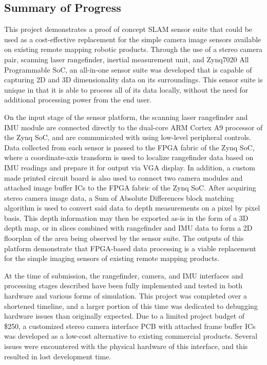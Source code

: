 \subsection{Summary of Progress}
This project demonstrates a proof of concept SLAM sensor suite that could be used as a cost-effective replacement for the simple camera image sensors available on existing remote mapping robotic products. Through the use of a stereo camera pair, scanning laser rangefinder, inertial measurement unit, and Zynq7020 All Programmable SoC, an all-in-one sensor suite was developed that is capable of capturing 2D and 3D dimensionality data on its surroundings. This sensor suite is unique in that it is able to process all of its data locally, without the need for additional processing power from the end user.
\par
On the input stage of the sensor platform, the scanning laser rangefinder and IMU module are connected directly to the dual-core ARM Cortex A9 processor of the Zynq SoC, and are communicated with using low-level peripheral controls. Data collected from each sensor is passed to the FPGA fabric of the Zynq SoC, where a coordinate-axis transform is used to localize rangefinder data based on IMU readings and prepare it for output via VGA display. In addition, a custom made printed circuit board is also used to connect two camera modules and attached image buffer ICs to the FPGA fabric of the Zynq SoC. After acquiring stereo camera image data, a Sum of Absolute Differences block matching algorithm is used to convert said data to depth measurements on a pixel by pixel basis. This depth information may then be exported as-is in the form of a 3D depth map, or in slices combined with rangefinder and IMU data to form a 2D floorplan of the area being observed by the sensor suite. The outputs of this platform demonstrate that FPGA-based data processing is a viable replacement for the simple imaging sensors of existing remote mapping products. 
\par
At the time of submission, the rangefinder, camera, and IMU interfaces and processing stages described have been fully implemented and tested in both hardware and various forms of simulation. This project was completed over a shortened timeline, and a larger portion of this time was dedicated to debugging hardware issues than originally expected. Due to a limited project budget of \$250, a customized stereo camera interface PCB with attached frame buffer ICs was developed as a low-cost alternative to existing commercial products. Several issues were encountered with the physical hardware of this interface, and this resulted in lost development time. 
